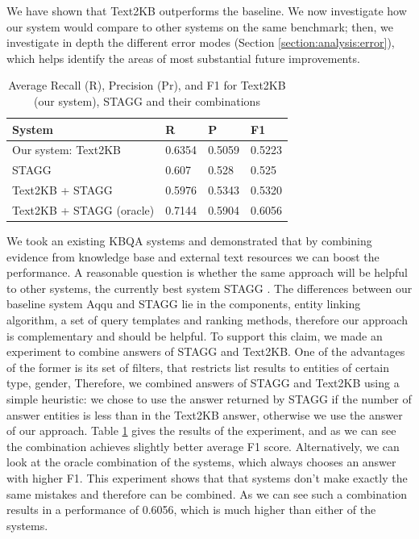 
We have shown that Text2KB outperforms the baseline.
We now investigate how our system would compare to other systems on the same benchmark; then, we investigate in depth the different error modes (Section \ref{section:analysis:error}), which helps identify the areas of most substantial future improvements. 



\begin{table}
\centering
\caption{Average Recall (R), Precision (Pr), and F1 for Text2KB (our system), STAGG and their combinations}
\label{table:combine_stagg}
\begin{tabular}{| p{4cm} | p{1cm} | p{1cm} | p{1cm} | }
\hline
System & R & P & F1 \\
\hline
Our system: Text2KB & 0.6354 & 0.5059 & 0.5223 \\
STAGG \cite{yih2015semantic} & 0.607 & 0.528 & 0.525\\
\hline
Text2KB + STAGG & 0.5976 & 0.5343 & 0.5320 \\
Text2KB + STAGG (oracle) & 0.7144 & 0.5904 & 0.6056 \\
\hline
\end{tabular}
\end{table}

We took an existing KBQA systems and demonstrated that by combining evidence from knowledge base and external text resources we can boost the performance.
A reasonable question is whether the same approach will be helpful to other systems, \eg the currently best system STAGG \cite{yih2015semantic}.
The differences between our baseline system Aqqu and STAGG lie in the components, \ie entity linking algorithm, a set of query templates and ranking methods, therefore our approach is complementary and should be helpful.
To support this claim, we made an experiment to combine answers of STAGG and Text2KB.
One of the advantages of the former is its set of filters, that restricts list results to entities of certain type, gender, \etc
Therefore, we combined answers of STAGG and Text2KB using a simple heuristic: we chose to use the answer returned by STAGG if the number of answer entities is less than in the Text2KB answer, otherwise we use the answer of our approach.
Table \ref{table:combine_stagg} gives the results of the experiment, and as we can see the combination achieves slightly better average F1 score.
Alternatively, we can look at the oracle combination of the systems, which always chooses an answer with higher F1.
This experiment shows that that systems don't make exactly the same mistakes and therefore can be combined.
As we can see such a combination results in a performance of 0.6056, which is much higher than either of the systems.

